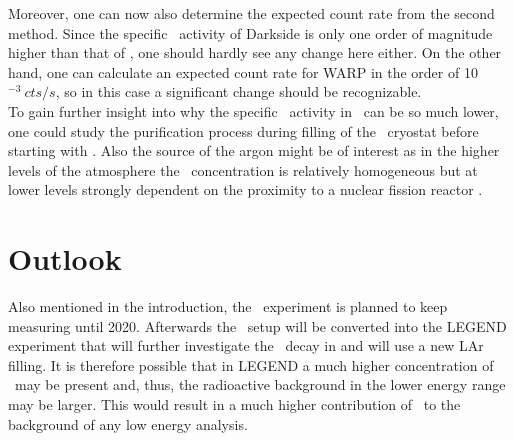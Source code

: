 \documentclass[encoding=utf8,british]{tumphthesis}
\begin{document}
Moreover, one can now also determine the expected count rate from the second method.
Since the specific \Kr\ activity of Darkside is only one order of magnitude higher than that of \gerda, one should hardly see any change here either.
On the other hand, one can calculate an expected count rate for WARP in the order of 10$^{-3} \  \unit{cts} / \unit{s}$, so in this case a significant change should be recognizable.
\\

To gain further insight into why the specific \Kr\ activity in \gerda\ can be so much lower, one could study the purification process during filling of the \gerda\ cryostat before starting with \PI.
Also the source of the argon might be of interest as in the higher levels of the atmosphere the \Kr\ concentration is relatively homogeneous \cite{j._jacob_atmospheric_1987} but at lower levels strongly dependent on the proximity to a nuclear fission reactor \cite{weiss_mesoscale_1986}.
\\



\section{Outlook}
Also mentioned in the introduction, the \gerda\ experiment is planned to keep measuring until 2020.
Afterwards the \gerda\ setup will be converted into the LEGEND experiment that will further investigate the \onbb\ decay in  and will use a new LAr filling.
It is therefore possible that in LEGEND a much higher concentration of \Kr\ may be present and, thus, the radioactive background in the lower energy range may be larger.
This would result in a much higher contribution of \Kr\ to the background of any low energy analysis.
\\









\backmatter
\printbibliography
%
%
\end{document}
